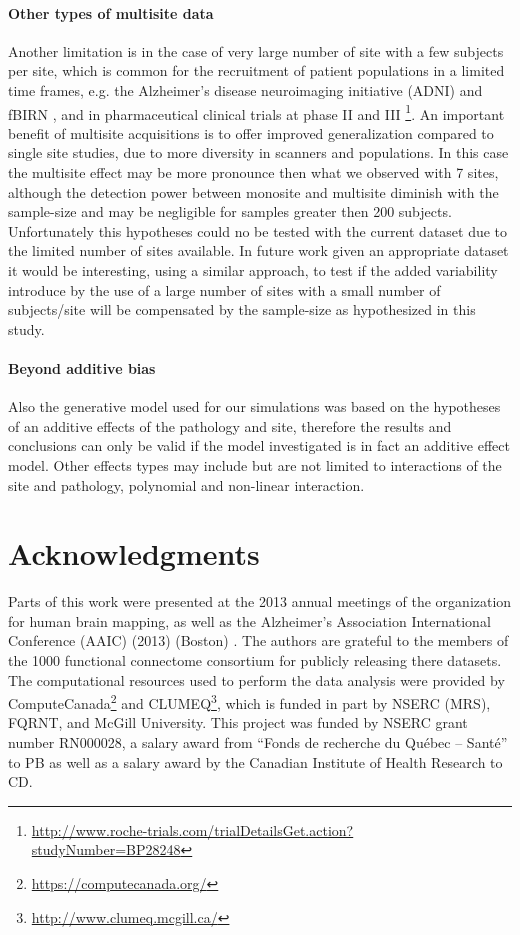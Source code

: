 \documentclass[authoryear]{elsarticle}
\begin{document}
\paragraph{Other types of multisite data} Another limitation is in the case of very large number of site with a few subjects per site, which is common for the recruitment of patient populations in a limited time frames, e.g. the Alzheimer’s disease neuroimaging initiative (ADNI) \citep{Mueller2005} and fBIRN \citep{Friedman2006,Friedman2006a}, and in pharmaceutical clinical trials at phase II and III \footnote{\url{http://www.roche-trials.com/trialDetailsGet.action?studyNumber=BP28248}}. An important benefit of multisite acquisitions is to offer improved generalization compared to single site studies, due to more diversity in scanners and populations. In this case the multisite effect may be more pronounce then what we observed with 7 sites, although the detection power between monosite and multisite diminish with the sample-size and may be negligible for samples greater then 200 subjects. Unfortunately this hypotheses could no be tested with the current dataset due to the limited number of sites available. In future work given an appropriate dataset it would be interesting, using a similar approach, to test if the added variability introduce by the use of a large number of sites with a small number of subjects/site will be compensated by the sample-size as hypothesized in this study.

\paragraph{Beyond additive bias} Also the generative model used for our simulations was based on the hypotheses of an additive effects of the pathology and site, therefore the results and conclusions can only be valid if the model investigated is in fact an additive effect model. Other effects types may include but are not limited to interactions of the site and pathology, polynomial and non-linear interaction.

\section{Acknowledgments}
Parts of this work were presented at the 2013 annual meetings of the organization for human brain mapping, as well as the  Alzheimer's Association International Conference (AAIC) (2013) (Boston) \citep{Dansereau2013b}. The authors are grateful to the members of the 1000 functional connectome consortium for publicly releasing there datasets. The computational resources used to perform the data analysis were provided by ComputeCanada\footnote{\url{https://computecanada.org/}} and CLUMEQ\footnote{\url{http://www.clumeq.mcgill.ca/}}, which is funded in part by NSERC (MRS), FQRNT, and McGill University. This project was funded by NSERC grant number RN000028, a salary award from ``Fonds de recherche du Qu\'ebec -- Sant\'e'' to PB as well as a salary award by the Canadian Institute of Health Research to CD.
\end{document}

